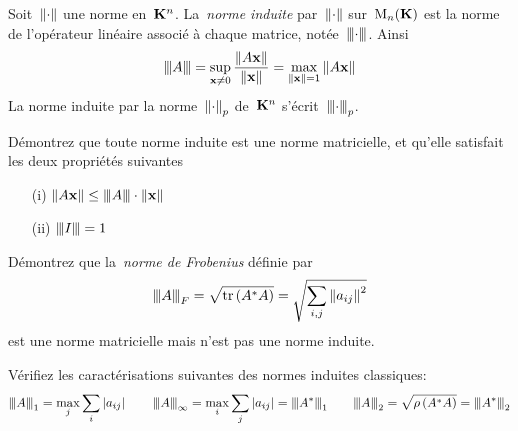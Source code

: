 
\begin{definition}
	Soit~$\Abs\cdot$ une norme en~$\K^n$.  La~\emph{norme induite}
	par~$\Abs\cdot$ sur~$\M_n(\K)$ est la norme de l'opérateur
	linéaire %
	associé à chaque matrice, notée~$\ABS\cdot$.  Ainsi
	\[
		\ABS{A}
		=
		\sup_{\x\neq0}\frac{\Abs{A\x}}{\Abs\x}
		=
		\max_{\Abs\x=1}\Abs{A\x}
	\]
	La norme induite par la norme~$\Abs\cdot_p$ de~$\K^n$
	s'écrit~$\ABS\cdot_p$.
\end{definition}

\begin{exercice}
	Démontrez que toute norme induite est une norme matricielle, et qu'elle
	satisfait les deux propriétés suivantes
	\begin{enumerate}
		\item[(i)] $\Abs{A\x}\le\ABS A\cdot\Abs\x$
		\item[(ii)] $\ABS I = 1$
	\end{enumerate}
\end{exercice}

\begin{exercice}
	Démontrez que la~\emph{norme de Frobenius} définie par
	\[
		\ABS A_F
		=
		\sqrt{\mathrm{tr}\parens{A^*A}}
		=
		\sqrt{\sum_{i,j}\Abs{a_{ij}}^2}
	\]
	est une norme matricielle mais n'est pas une norme induite.
\end{exercice}


\begin{exercice}
	Vérifiez les caractérisations suivantes des normes induites classiques:
	\[
		\ABS A_1      = \max_j\sum_i\abs{a_{ij}}
		\qquad
		\ABS A_\infty = \max_i\sum_j\abs{a_{ij}} = \ABS{A^*}_1
		\qquad
		\ABS A_2      = \sqrt{\rho\parens{A^*A}} = \ABS{A^*}_2
	\]
\end{exercice}


